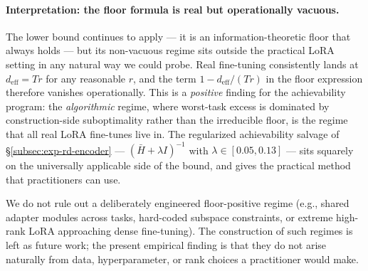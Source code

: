 \paragraph{Interpretation: the floor formula is real but operationally vacuous.}
The lower bound continues to apply --- it is an information-theoretic
floor that always holds --- but its non-vacuous regime sits outside
the practical LoRA setting in any natural way we could probe. Real
fine-tuning consistently lands at $d_{\mathrm{eff}} = Tr$ for any
reasonable $r$, and the term $1 - d_{\mathrm{eff}}/(Tr)$ in the
floor expression therefore vanishes operationally. This is a
\emph{positive} finding for the achievability program: the
\emph{algorithmic} regime, where worst-task excess is dominated by
construction-side suboptimality rather than the irreducible floor,
is the regime that all real LoRA fine-tunes live in. The
regularized achievability salvage of
\S\ref{subsec:exp-rd-encoder} ---
$(\bar H + \lambda I)^{-1}$ with $\lambda \in [0.05, 0.13]$ ---
sits squarely on the universally applicable side of the bound, and
gives the practical method that practitioners can use.

We do not rule out a deliberately engineered floor-positive regime
(e.g., shared adapter modules across tasks, hard-coded subspace
constraints, or extreme high-rank LoRA approaching dense
fine-tuning). The construction of such regimes is left as future
work; the present empirical finding is that they do not arise
naturally from data, hyperparameter, or rank choices a
practitioner would make.

